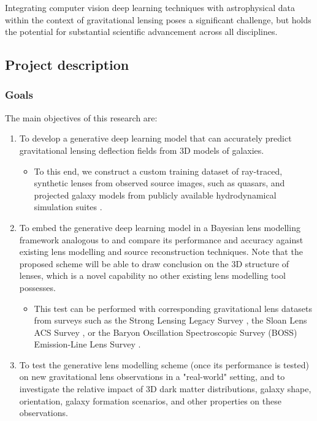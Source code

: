 \documentclass[a4paper,10pt]{article}
\begin{document}
Integrating computer vision deep learning techniques with
astrophysical data within the context of gravitational lensing poses a
significant challenge, but holds the potential for substantial
scientific advancement across all disciplines.

\subsection{Project description}
\label{sec:org1e9192f}


\subsubsection{Goals}
\label{sec:org7fb55e4}
\label{sec:goals}

The main objectives of this research are:

\begin{enumerate}
\item To develop a generative deep learning model that can accurately
predict gravitational lensing deflection fields from 3D models of
galaxies.
\begin{itemize}
\item To this end, we construct a custom training dataset of
ray-traced, synthetic lenses from observed source images, such as
quasars, and projected galaxy models from publicly available
hydrodynamical simulation suites
\citep{Springel17,Nelson18,Dave19}.
\end{itemize}
\item To embed the generative deep learning model in a Bayesian lens
modelling framework analogous to
\cite{Adam22,Denzel21,Morningstar19,Hezaveh17} and compare
its performance and accuracy against existing lens modelling and
source reconstruction techniques. Note that the proposed scheme
will be able to draw conclusion on the 3D structure of lenses,
which is a novel capability no other existing lens modelling tool
possesses.
\begin{itemize}
\item This test can be performed with corresponding gravitational lens
datasets from surveys such as the Strong Lensing Legacy Survey
\citep[SL2S:][]{Gavazzi12,Sonnenfeld15}, the Sloan Lens ACS
Survey \citep[SLACS:][]{Bolton2006,Shu17}, or the Baryon
Oscillation Spectroscopic Survey (BOSS) Emission-Line Lens Survey
\citep[BELLS:][]{Brownstein11,Shu2016}.
\end{itemize}
\item To test the generative lens modelling scheme (once its performance
is tested) on new gravitational lens observations in a "real-world"
setting, and to investigate the relative impact of 3D dark matter
distributions, galaxy shape, orientation, galaxy formation
scenarios, and other properties on these observations.
\end{enumerate}
\end{document}
